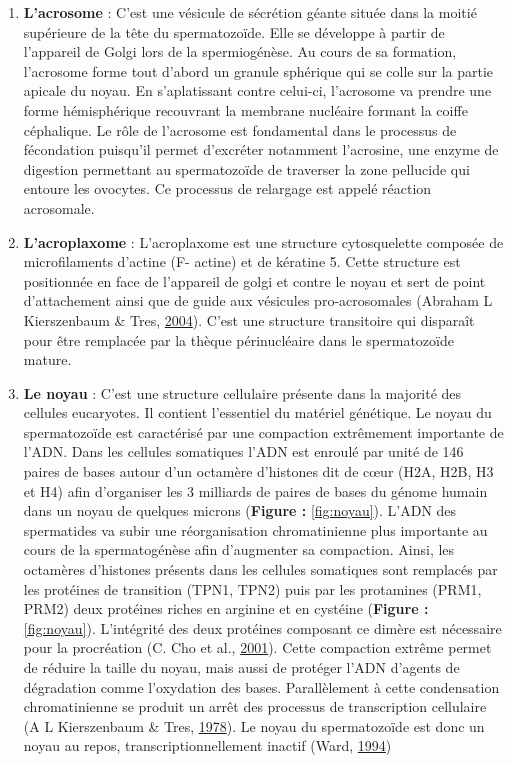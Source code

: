 \documentclass[12pt,twoside]{reedthesis}
\providecommand{\tightlist}{%
  \setlength{\itemsep}{0pt}\setlength{\parskip}{0pt}}
\theoremstyle{definition}
\theoremstyle{definition}
\theoremstyle{remark}
\begin{document}
  \begin{enumerate}
  \def\labelenumi{\arabic{enumi}.}
  \tightlist
  \item
    \textbf{L'acrosome} : C'est une vésicule de sécrétion géante située
    dans la moitié supérieure de la tête du spermatozoïde. Elle se
    développe à partir de l'appareil de Golgi lors de la spermiogénèse. Au
    cours de sa formation, l'acrosome forme tout d'abord un granule
    sphérique qui se colle sur la partie apicale du noyau. En
    s'aplatissant contre celui-ci, l'acrosome va prendre une forme
    hémisphérique recouvrant la membrane nucléaire formant la coiffe
    céphalique. Le rôle de l'acrosome est fondamental dans le processus de
    fécondation puisqu'il permet d'excréter notamment l'acrosine, une
    enzyme de digestion permettant au spermatozoïde de traverser la zone
    pellucide qui entoure les ovocytes. Ce processus de relargage est
    appelé réaction acrosomale.\\
  \item
    \textbf{L'acroplaxome} : L'acroplaxome est une structure cytosquelette
    composée de microfilaments d'actine (F- actine) et de kératine 5.
    Cette structure est positionnée en face de l'appareil de golgi et
    contre le noyau et sert de point d'attachement ainsi que de guide aux
    vésicules pro-acrosomales (Abraham L Kierszenbaum \& Tres,
    \protect\hyperlink{ref-Kierszenbaum2004}{2004}). C'est une structure
    transitoire qui disparaît pour être remplacée par la thèque
    périnucléaire dans le spermatozoïde mature.\\
  \item
    \textbf{Le noyau} : C'est une structure cellulaire présente dans la
    majorité des cellules eucaryotes. Il contient l'essentiel du matériel
    génétique. Le noyau du spermatozoïde est caractérisé par une
    compaction extrêmement importante de l'ADN. Dans les cellules
    somatiques l'ADN est enroulé par unité de 146 paires de bases autour
    d'un octamère d'histones dit de cœur (H2A, H2B, H3 et H4) afin
    d'organiser les 3 milliards de paires de bases du génome humain dans
    un noyau de quelques microns (\textbf{Figure : }\ref{fig:noyau}).
    L'ADN des spermatides va subir une réorganisation chromatinienne plus
    importante au cours de la spermatogénèse afin d'augmenter sa
    compaction. Ainsi, les octamères d'histones présents dans les cellules
    somatiques sont remplacés par les protéines de transition (TPN1, TPN2)
    puis par les protamines (PRM1, PRM2) deux protéines riches en arginine
    et en cystéine (\textbf{Figure : }\ref{fig:noyau}). L'intégrité des
    deux protéines composant ce dimère est nécessaire pour la procréation
    (C. Cho et al., \protect\hyperlink{ref-Cho2001}{2001}). Cette
    compaction extrême permet de réduire la taille du noyau, mais aussi de
    protéger l'ADN d'agents de dégradation comme l'oxydation des bases.
    Parallèlement à cette condensation chromatinienne se produit un arrêt
    des processus de transcription cellulaire (A L Kierszenbaum \& Tres,
    \protect\hyperlink{ref-Kierszenbaum1978}{1978}). Le noyau du
    spermatozoïde est donc un noyau au repos, transcriptionnellement
    inactif (Ward, \protect\hyperlink{ref-Ward1994}{1994})
  \end{enumerate}
  
\end{document}
